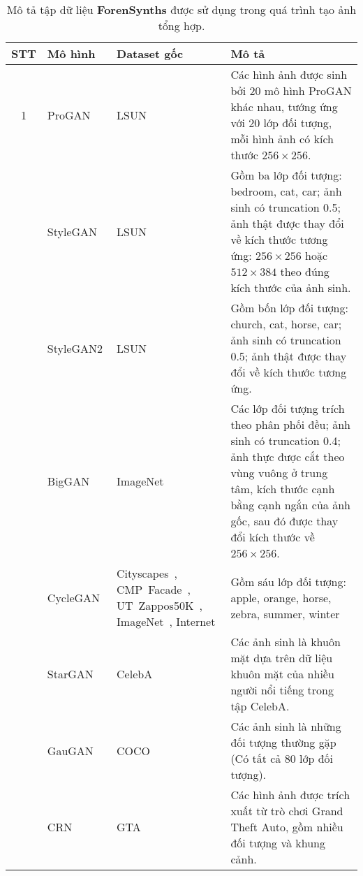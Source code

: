 \begin{table}[ht!]
	\centering
	\caption{Mô tả tập dữ liệu \textbf{ForenSynths} được sử dụng trong quá trình tạo ảnh tổng hợp.}
	\label{tab:forensynths-dataset}
	\begin{adjustbox}{max width=\textwidth}
		\renewcommand{\arraystretch}{1.5}
		\setlength{\tabcolsep}{10pt}
		\begin{tabular}{c p{2cm} p{3cm} p{8.5cm}}
			\toprule
			\textbf{STT} & \textbf{Mô hình} & \textbf{Dataset gốc} & \textbf{Mô tả} \\
			\midrule
			1 & ProGAN~\cite{karras2018progressive} & LSUN~\cite{Yu2015LSUNCO} & Các hình ảnh được sinh bởi 20 mô hình ProGAN khác nhau, tướng ứng với 20 lớp đối tượng, mỗi hình ảnh có kích thước  $256 \times 256$. \\
			\hdashline
			2 & StyleGAN~\cite{karras2019style} & LSUN~\cite{Yu2015LSUNCO} & Gồm ba lớp đối tượng: bedroom, cat, car; ảnh sinh có truncation 0.5; ảnh thật được thay đổi về kích thước tương ứng: $256 \times 256$ hoặc $512 \times 384$ theo đúng kích thước của ảnh sinh. \\
			\hdashline
			3 & StyleGAN2\cite{Karras2019AnalyzingAI} & LSUN~\cite{Yu2015LSUNCO} & Gồm bốn lớp đối tượng: church, cat, horse, car; ảnh sinh có truncation 0.5; ảnh thật được thay đổi về kích thước tương ứng. \\
			\hdashline
			4 & BigGAN~\cite{brock2018large} & ImageNet~\cite{5206848} & Các lớp đối tượng trích theo phân phối đều; ảnh sinh có truncation 0.4; ảnh thực được cắt theo vùng vuông ở trung tâm, kích thước cạnh bằng cạnh ngắn của ảnh gốc, sau đó được thay đổi kích thước về $256 \times 256$. \\
			\hdashline
			5 & CycleGAN~\cite{zhu2017unpaired} & Cityscapes~\cite{Cordts2016Cityscapes}, CMP~Facade~\cite{Tylecek13}, UT~Zappos50K~\cite{6909426}, ImageNet~\cite{5206848}, Internet & Gồm sáu lớp đối tượng: apple, orange, horse, zebra, summer, winter\\
			\hdashline
			6 & StarGAN~\cite{choi2018stargan} & CelebA~\cite{liu2015faceattributes} & Các ảnh sinh là khuôn mặt dựa trên dữ liệu khuôn mặt của nhiều người nổi tiếng trong tập CelebA.\\
			\hdashline
			7 & GauGAN~\cite{park2019SPADE} & COCO~\cite{lin2014microsoft} & Các ảnh sinh là những đối tượng thường gặp (Có tất cả 80 lớp đối tượng). \\
			\hdashline
			8 & CRN~\cite{chen2017photographic} & GTA~\cite{barua2025gta} & Các hình ảnh được trích xuất từ trò chơi Grand Theft Auto, gồm nhiều đối tượng và khung cảnh. \\

\end{tabular}
\end{adjustbox}
\end{table}
